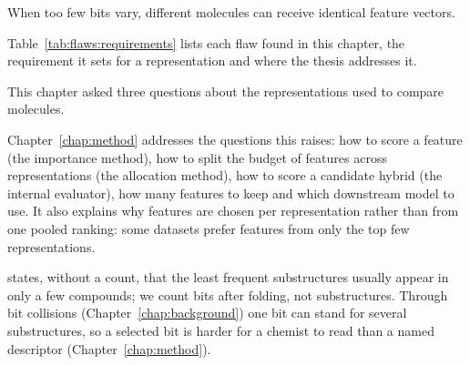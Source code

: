 
When too few bits vary, different molecules can receive identical feature vectors.

Table~\ref{tab:flaws:requirements} lists each flaw found in this chapter, the requirement it sets for a representation and where the thesis addresses it.

This chapter asked three questions about the representations used to compare molecules.

Chapter~\ref{chap:method} addresses the questions this raises: how to score a feature (the importance method), how to split the budget of features across representations (the allocation method), how to score a candidate hybrid (the internal evaluator), how many features to keep and which downstream model to use. It also explains why features are chosen per representation rather than from one pooled ranking: some datasets prefer features from only the top few representations.

\citet[p.~112]{Dablander2024} states, without a count, that the least frequent substructures usually appear in only a few compounds; we count bits after folding, not substructures. Through bit collisions (Chapter~\ref{chap:background}) one bit can stand for several substructures, so a selected bit is harder for a chemist to read than a named descriptor (Chapter~\ref{chap:method}).






